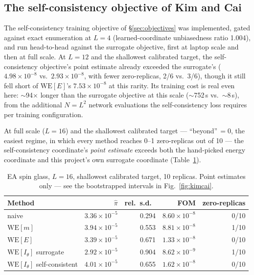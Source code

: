 \documentclass[a4paper,fleqn]{cas-sc}
\begin{document}
	\subsection{The self-consistency objective of Kim and Cai}\label{sec:kimcai}
	The self-consistency training objective of \S\ref{sec:objectives} was implemented, gated
	against exact enumeration at $L=4$ (learned-coordinate unbiasedness ratio 1.004), and run
	head-to-head against the surrogate objective, first at laptop scale and then at full scale.
	At $L=12$ and the shallowest calibrated target, the self-consistency objective's point
	estimate already exceeded the surrogate's ($4.98\times10^{-8}$ vs.\ $2.93\times10^{-8}$,
	with fewer zero-replicas, 2/6 vs.\ 3/6), though it still fell short of $\mathrm{WE}[E]$'s
	$7.53\times10^{-8}$ at this rarity. Its training cost is real even here:
	$\sim$94$\times$ longer than the surrogate objective at this scale ($\sim$752\,s vs.\
	$\sim$8\,s), from the additional $N=L^2$ network evaluations the self-consistency loss
	requires per training configuration.
	
	At full scale ($L=16$) and the shallowest calibrated target --- ``beyond''\,$=0$, the
	easiest regime, in which every method reaches 0--1 zero-replicas out of 10 --- the
	self-consistency coordinate's \emph{point estimate} exceeds both the hand-picked energy
	coordinate and this project's own surrogate coordinate (Table~\ref{tab:kimcai}).
	
	\begin{table}[H]
		\centering\small
		\caption{EA spin glass, $L=16$, shallowest calibrated target, 10 replicas. Point estimates
			only --- see the bootstrapped intervals in Fig.~\ref{fig:kimcai}.}
		\label{tab:kimcai}
		\begin{tabular}{lrrrr}
			\toprule
			Method & $\hat\pi$ & rel.\ s.d.\ & FOM & zero-replicas \\
			\midrule
			naive & $3.36\times10^{-5}$ & 0.294 & $8.60\times10^{-8}$ & 0/10 \\
			$\mathrm{WE}[m]$ & $3.94\times10^{-5}$ & 0.553 & $8.81\times10^{-8}$ & 1/10 \\
			$\mathrm{WE}[E]$ & $3.39\times10^{-5}$ & 0.671 & $1.33\times10^{-8}$ & 0/10 \\
			$\mathrm{WE}[I_\theta]$ surrogate & $2.92\times10^{-5}$ & 0.904 & $8.62\times10^{-9}$ & 1/10 \\
			$\mathrm{WE}[I_\theta]$ self-consistent & $4.01\times10^{-5}$ & 0.655 &
			$1.62\times10^{-8}$ & 0/10 \\
			\bottomrule
		\end{tabular}
	\end{table}
	
\end{document}

